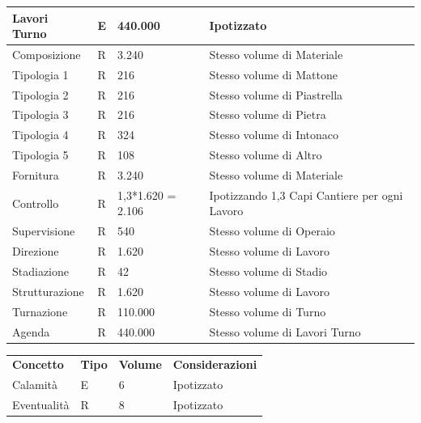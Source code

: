 \documentclass[12pt,a4paper]{report}
\begin{document}
\begin{center}
\begin{tabular}{|p{4cm}|p{1cm}|p{3cm}|p{8cm}|}
                Lavori Turno & E & 440.000 & Ipotizzato \\ \hline
                Composizione & R & 3.240 & Stesso volume di Materiale \\ \hline
                Tipologia 1 & R & 216 & Stesso volume di Mattone \\ \hline
                Tipologia 2 & R & 216 & Stesso volume di Piastrella \\ \hline
                Tipologia 3 & R & 216 & Stesso volume di Pietra \\ \hline
                Tipologia 4 & R & 324 & Stesso volume di Intonaco \\ \hline
                Tipologia 5 & R & 108 & Stesso volume di Altro \\ \hline
                Fornitura & R & 3.240 & Stesso volume di Materiale \\ \hline
                Controllo & R & 1,3*1.620 = 2.106 & Ipotizzando 1,3 Capi Cantiere per ogni Lavoro \\ \hline
                Supervisione & R & 540 & Stesso volume di Operaio \\ \hline
                Direzione & R & 1.620 & Stesso volume di Lavoro \\ \hline
                Stadiazione & R & 42 & Stesso volume di Stadio \\ \hline
                Strutturazione & R & 1.620 & Stesso volume di Lavoro \\ \hline
                Turnazione & R & 110.000 & Stesso volume di Turno \\ \hline
                Agenda & R & 440.000 & Stesso volume di Lavori Turno \\ \hline
            \end{tabular}
            
            \begin{tabular}{|p{4cm}|p{1cm}|p{3cm}|p{8cm}|}
                \hline
                \rowcolor{rosso}\multicolumn{4}{|c|}{\textbf{Area Analisi Rischio}} \\ \hline
                \textbf{Concetto} & \textbf{Tipo} & \textbf{Volume} & \textbf{Considerazioni} \\ \hline
                Calamità & E & 6 & Ipotizzato \\ \hline
                Eventualità & R & 8 & Ipotizzato \\ \hline
            \end{tabular}
            

\end{center}
\end{document}
